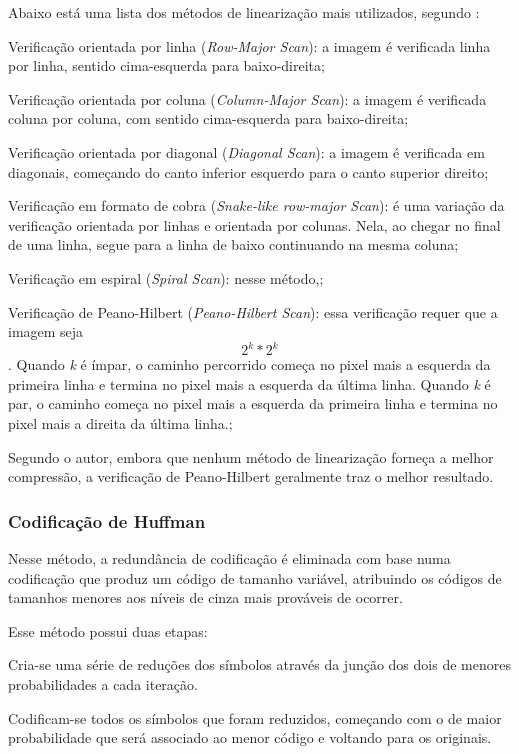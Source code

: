 Abaixo está uma lista dos métodos de linearização mais utilizados, segundo \citeauthor{losslessmethods}:

\begin{alineas}
    \item Verificação orientada por linha ({\em Row-Major Scan}): a imagem é verificada linha por linha, sentido cima-esquerda para baixo-direita;
    \item Verificação orientada por coluna ({\em Column-Major Scan}): a imagem é verificada coluna por coluna, com sentido cima-esquerda para baixo-direita;
    \item Verificação orientada por diagonal ({\em Diagonal Scan}): a imagem é verificada em diagonais, começando do canto inferior esquerdo para o canto superior direito;
    \item Verificação em formato de cobra ({\em Snake-like row-major Scan}): é uma variação da verificação orientada por linhas e orientada por colunas. Nela, ao chegar no final de uma linha, segue para a linha de baixo continuando na mesma coluna;
    \item Verificação em espiral ({\em Spiral Scan}): nesse método,;
    \item Verificação de Peano-Hilbert ({\em Peano-Hilbert Scan}): essa verificação requer que a imagem seja \[ 2^k * 2^k \]. Quando {\em k} é ímpar, o caminho percorrido começa no pixel mais a esquerda da primeira linha e termina no pixel mais a esquerda da última linha. Quando {\em k} é par, o caminho começa no pixel mais a esquerda da primeira linha e termina no pixel mais a direita da última linha.;
\end{alineas}

Segundo o autor, embora que nenhum método de linearização forneça a melhor compressão, a verificação de Peano-Hilbert geralmente traz o melhor resultado.

\subsubsection{Codificação de Huffman}
\label{sss.huffmancoding}

Nesse método, a redundância de codificação é eliminada com base numa codificação que produz um código de tamanho variável, atribuindo os códigos de tamanhos menores aos níveis de cinza mais prováveis de ocorrer.

Esse método possui duas etapas:

\begin{alineas}
    \item Cria-se uma série de reduções dos símbolos através da junção dos dois de menores probabilidades a cada iteração.
    \item Codificam-se todos os símbolos que foram reduzidos, começando com o de maior probabilidade que será associado ao menor código e voltando para os originais.
\end{alineas}

